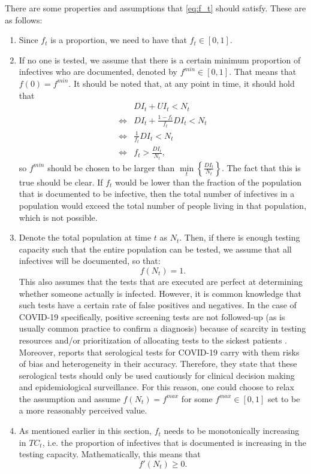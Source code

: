 \documentclass[12pt]{article}
\begin{document}
	There are some properties and assumptions that \eqref{eq:f_t} should satisfy. These are as follows:
	\begin{enumerate}[label=(A\arabic*)]
		\item\label{ass:undoc_proportion} Since $f_t$ is a proportion, we need to have that $f_t \in [0,1]$.
		\item\label{ass:undoc_f0} If no one is tested, we assume that there is a certain minimum proportion of infectives who are documented, denoted by $f^{min} \in [0,1]$. That means that $f(0) = f^{min}$. It should be noted that, at any point in time, it should hold that
    	    \begin{align*}
        	    & DI_t + UI_t < N_t \\
        	    \iff & DI_t + \frac{1-f_t}{f_t}DI_t < N_t \\
        	    \iff & \frac{1}{f_t}DI_t < N_t \\
        	    \iff & f_t > \frac{DI_t}{N_t},
    	    \end{align*}
		so $f^{min}$ should be chosen to be larger than $\min\limits_{t}\left\{\frac{DI_t}{N_t}\right\}$. The fact that this is true should be clear. If $f_t$ would be lower than the fraction of the population that is documented to be infective, then the total number of infectives in a population would exceed the total number of people living in that population, which is not possible.
		
		\item\label{ass:undoc_fN} Denote the total population at time $t$ as $N_t$. Then, if there is enough testing capacity such that the entire population can be tested, we assume that all infectives will be documented, so that:
		    \[f(N_t) = 1.\]
		This also assumes that the tests that are executed are perfect at determining whether someone actually is infected. However, it is common knowledge that such tests have a certain rate of false positives and negatives. In the case of COVID-19 specifically, positive screening tests are not followed-up (as is usually common practice to confirm a diagnosis) because of scarcity in testing resources and/or prioritization of allocating tests to the sickest patients \parencite{frasier2020tests}. Moreover, \textcite{bmj2020testaccuracy} reports that serological tests for COVID-19 carry with them risks of bias and heterogeneity in their accuracy. Therefore, they state that these serological tests should only be used cautiously for clinical decision making and epidemiological surveillance. For this reason, one could choose to relax the assumption and assume $f(N_t) = f^{max}$ for some $f^{max} \in [0,1]$ set to be a more reasonably perceived value.
		
		\item\label{ass:undoc_monotonicity} As mentioned earlier in this section, $f_t$ needs to be monotonically increasing in $TC_t$, i.e. the proportion of infectives that is documented is increasing in the testing capacity. Mathematically, this means that
		    \[f'(N_t) \geq 0.\]
	\end{enumerate}
	
\end{document}
